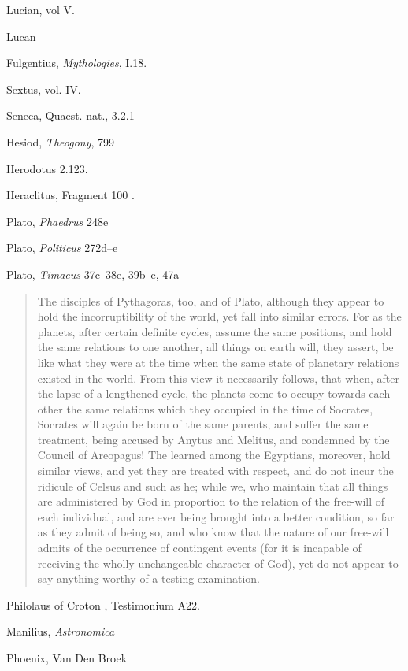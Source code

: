 \documentclass{amsart}
\theoremstyle{definition}
\begin{document}
Lucian, vol V.

Lucan

Fulgentius, {\em Mythologies}, I.18.

Sextus, vol. IV.

Seneca, Quaest. nat., 3.2.1

Hesiod, {\em Theogony}, 799

Herodotus 2.123.

Heraclitus, Fragment 100 \cite[pp.~294--305]{heraclitus}. 

Plato, {\em Phaedrus} 248e

Plato, {\em Politicus} 272d--e

Plato, {\em Timaeus} 37c--38e, 39b--e, 47a \cite[pp.~97--106, 115--117, 157]{timaeus}



\begin{quote}
The disciples of Pythagoras, too, and of Plato, although they appear to hold the incorruptibility of the world, yet fall into similar errors. For as the planets, after certain definite cycles, assume the same positions, and hold the same relations to one another, all things on earth will, they assert, be like what they were at the time when the same state of planetary relations existed in the world. From this view it necessarily follows, that when, after the lapse of a lengthened cycle, the planets come to occupy towards each other the same relations which they occupied in the time of Socrates, Socrates will again be born of the same parents, and suffer the same treatment, being accused by Anytus and Melitus, and condemned by the Council of Areopagus! The learned among the Egyptians, moreover, hold similar views, and yet they are treated with respect, and do not incur the ridicule of Celsus and such as he; while we, who maintain that all things are administered by God in proportion to the relation of the free-will of each individual, and are ever being brought into a better condition, so far as they admit of being so, and who know that the nature of our free-will admits of the occurrence of contingent events (for it is incapable of receiving the wholly unchangeable character of God), yet do not appear to say anything worthy of a testing examination.
\end{quote}

Philolaus of Croton \cite[p.~276]{philolaus}, Testimonium A22.

Manilius, {\em Astronomica} 

Phoenix, Van Den Broek \cite{phoenix}
\end{document}
